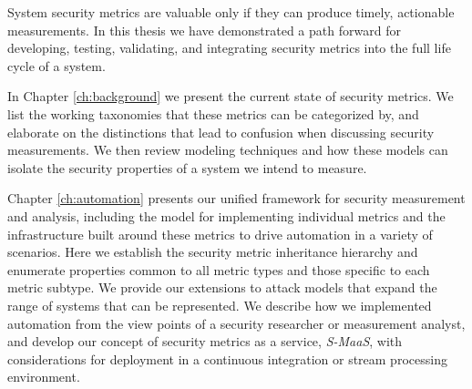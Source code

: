 
System security metrics are valuable only if they can produce timely, actionable measurements. In this thesis we have demonstrated a path forward for developing, testing, validating, and integrating security metrics into the full life cycle of a system. 

In Chapter \ref{ch:background} we present the current state of security metrics. We list the working taxonomies that these metrics can be categorized by, and elaborate on the distinctions that lead to confusion when discussing security measurements. We then review modeling techniques and how these models can isolate the security properties of a system we intend to measure. 

Chapter \ref{ch:automation} presents our unified framework for security measurement and analysis, including the model for implementing individual metrics and the infrastructure built around these metrics to drive automation in a variety of scenarios. Here we establish the security metric inheritance hierarchy and enumerate properties common to all metric types and those specific to each metric subtype. We provide our extensions to attack models that expand the range of systems that can be represented. We describe how we implemented automation from the view points of a security researcher or measurement analyst, and develop our concept of security metrics as a service, \textit{S-MaaS}, with considerations for deployment in a continuous integration or stream processing environment.


